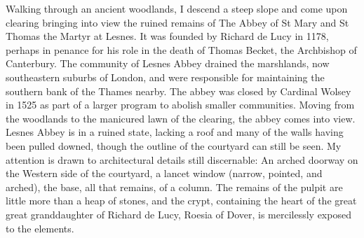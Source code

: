Walking through an ancient woodlands, I descend a steep slope and come upon clearing bringing into view the ruined remains of The Abbey of St Mary and St Thomas the Martyr at Lesnes. It was founded by Richard de Lucy in 1178, perhaps in penance for his role in the death of Thomas Becket, the Archbishop of Canterbury. The community of Lesnes Abbey drained the marshlands, now southeastern suburbs of London, and were responsible for maintaining the southern bank of the Thames nearby. The abbey was closed by Cardinal Wolsey in 1525 as part of a larger program to abolish smaller communities. Moving from the woodlands to the manicured lawn of the clearing, the abbey comes into view. Lesnes Abbey is in a ruined state, lacking a roof and many of the walls having been pulled downed, though the outline of the courtyard can still be seen.
%
My attention is drawn to architectural details still discernable: An arched doorway on the Western side of the courtyard, a lancet window (narrow, pointed, and arched), the base, all that remains, of a column. The remains of the pulpit are little more than a heap of stones, and the crypt, containing the heart of the great great granddaughter of Richard de Lucy, Roesia of Dover, is mercilessly exposed to the elements.
%
